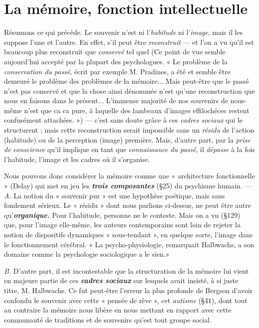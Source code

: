 \section{La mémoire, fonction intellectuelle}%
Résumons ce
qui précède. Le souvenir n’est ni l’{\it habitude} ni l’{\it image}, mais il les
suppose l’une et l’autre. En effet, s’il peut être {\it reconstruit} — et l’on
a vu qu’il est beaucoup plus reconstruit que {\it conservé} tel quel
{\scriptsize (Ce point de vue semble aujourd’hui accepté par la plupart des psychologues. « Le
problème de la {\it conservation du passé}, écrit par exemple M. Pradines, a été et semble
être demeuré le problème des problèmes de la mémoire... Mais peut-être que le passé
n'est pas conservé et que la chose ainsi dénommée n'est qu’une reconstruction que nous
en faisons dans le présent... L'immense majorité de nos souvenirs de nous-même n'est
que ca ca pure, à laquelle des lambeaux d'images effilochéces restent confusément
attachées. »)}
 —
c’est sans doute grâce à ces {\it cadres sociaux} qui le structurent ; mais
cette reconstruction serait impossible sans un {\it résidu} de l’action (habitude)
ou de la perception (image) première. Mais, d'autre part, par
la {\it prise de conscience} qu’il implique en tant que {\it connaissance du passé},
il {\it dépasse} à la fois l'habitude, l’image et les cadres où il s’organise.

Nous pouvons donc considérer la mémoire comme une « architecture
fonctionnelle » (Delay) qui met en jeu les \textbf{\textit {trois composantes}}
(\S 25) du psychisme humain. — {\it A.} La notion du « souvenir pur » est
une hypothèse poétique, mais sans fondement sérieux. Le « résidu »
dont nous parlions ci-dessus, ne peut être autre qu’\textbf{\textit {organique.}} Pour
l'habitude, personne ne le conteste. Mais on a vu (\S 129) que, pour
l’image elle-même, les auteurs contemporains sont loin de rejeter la
notion de dispositifs dynamiques « sous-tendant », en quelque sorte,
l’image dans le fonctionnement cérébral. « La psycho-physiologie,
remarquait Halbwachs, a son domaine comme la psychologie sociologique
a le sien.»

{\it B.} D’autre part, il est incontestable que la structuration de la
mémoire lui vient en majeure partie de ces \textbf{\textit {cadres sociaux}} sur lesquels
avait insisté, à si juste titre, M. Halbwachs. Ce fut peut-être
l'erreur la plus profonde de Bergson d’avoir confondu le souvenir
avec cette « pensée de rêve », cet {\it autisme} (\S 41), dont tout au contraire
la mémoire nous libère en nous mettant en rapport avec cette communauté
de traditions et de souvenirs qu’est tout groupe social.

